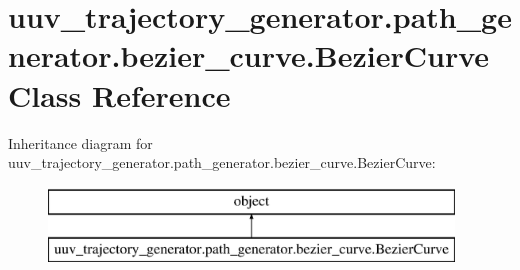 \hypertarget{classuuv__trajectory__generator_1_1path__generator_1_1bezier__curve_1_1BezierCurve}{}\section{uuv\+\_\+trajectory\+\_\+generator.\+path\+\_\+generator.\+bezier\+\_\+curve.\+Bezier\+Curve Class Reference}
\label{classuuv__trajectory__generator_1_1path__generator_1_1bezier__curve_1_1BezierCurve}
Inheritance diagram for uuv\+\_\+trajectory\+\_\+generator.\+path\+\_\+generator.\+bezier\+\_\+curve.\+Bezier\+Curve\+:\begin{figure}[H]
\begin{center}
\leavevmode
\includegraphics[height=2.000000cm]{classuuv__trajectory__generator_1_1path__generator_1_1bezier__curve_1_1BezierCurve}
\end{center}
\end{figure}
